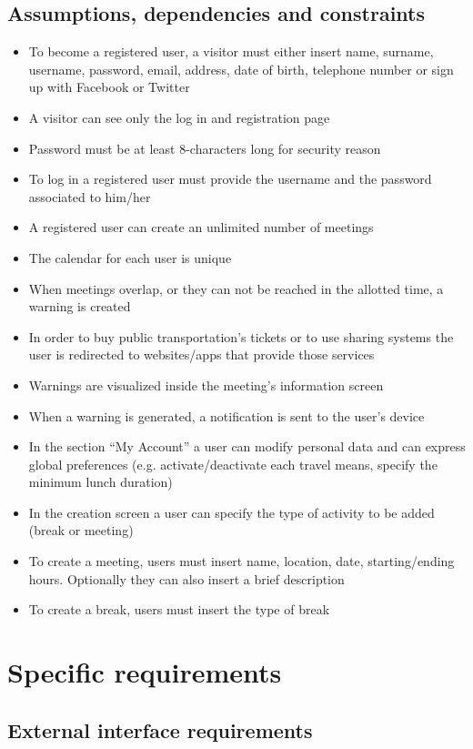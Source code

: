 \documentclass[12pt,titlepage]{article}
\begin{document}
\subsection{Assumptions, dependencies and constraints}\label{sec:mod1}
\begin{itemize}
\item To become a registered user, a visitor must either insert name, surname, username, password, email, address, date of birth, telephone number or sign up with Facebook or Twitter
\item A visitor can see only the log in and registration page
\item Password must be at least 8-characters long for security reason
\item To log in a registered user must provide the username and the password associated to him/her
\item A registered user can create an unlimited number of meetings
\item The calendar for each user is unique
\item When meetings overlap, or they can not be reached in the allotted time, a warning is created
\item In order to buy public transportation's tickets or to use sharing systems the user is redirected to websites/apps that provide those services
\item Warnings are visualized inside the meeting's information screen
\item When a warning is generated, a notification is sent to the user's device 
\item In the section ``My Account'' a user can modify personal data and can express global preferences (e.g. activate/deactivate each travel means, specify the minimum lunch duration)
\item In the creation screen a user can specify the type of activity to be added (break or meeting)
\item To create a meeting, users must insert name, location, date, starting/ending hours. Optionally they can also insert a brief description 
\item To create a break, users must insert the type of break
\end{itemize}
\section{Specific requirements}\label{sec:crit}

\subsection{External interface requirements}\label{sec:mod1}
\end{document}
